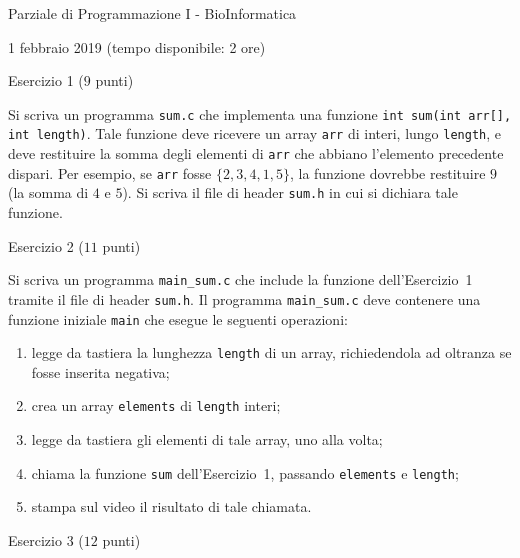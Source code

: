 \documentclass[12pt]{article}
\begin{document}
\begin{center}{\LARGE Parziale di Programmazione I - BioInformatica}\\
\vspace*{-2ex}
\begin{center}
  \large 1 febbraio 2019 (tempo disponibile: 2 ore)
\end{center}
\end{center}

\vspace*{1ex}
\begin{center}{\Large Esercizio 1} ($9$ punti)
\end{center}
Si scriva un programma \texttt{sum.c} che implementa una funzione \texttt{int sum(int arr[], int length)}. Tale funzione deve ricevere un array \texttt{arr} di interi, lungo \texttt{length}, e deve restituire la somma degli elementi di \texttt{arr} che abbiano l'elemento precedente dispari. Per esempio, se \texttt{arr} fosse $\{2,3,4,1,5\}$, la funzione dovrebbe restituire $9$ (la somma di $4$ e $5$). Si scriva il file di header \texttt{sum.h} in cui si dichiara tale funzione.

\vspace*{1ex}
\begin{center}{\Large Esercizio 2} ($11$ punti)\end{center}
%
Si scriva un programma \texttt{main\_sum.c} che include la funzione dell'Esercizio~1 tramite
il file di header \texttt{sum.h}.
Il programma \texttt{main\_sum.c} deve contenere una funzione iniziale \texttt{main} che esegue
le seguenti operazioni:
\begin{enumerate}
\item legge da tastiera la lunghezza \texttt{length} di un array, richiedendola ad oltranza se fosse inserita negativa;
\item crea un array \texttt{elements} di \texttt{length} interi;
\item legge da tastiera gli elementi di tale array, uno alla volta;
\item chiama la funzione \texttt{sum} dell'Esercizio~1, passando \texttt{elements} e \texttt{length};
\item stampa sul video il risultato di tale chiamata.
\end{enumerate}

\vspace*{1ex}
\begin{center}{\Large Esercizio 3} ($12$ punti)\end{center}
\end{document}
